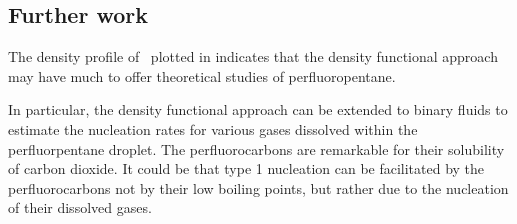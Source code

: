 






\subsection{Further work}
The density profile of \pfp\ plotted in 
indicates that the density functional approach may 
have much to offer theoretical studies of perfluoropentane.

In particular, the density functional approach can be
extended to binary fluids\cite{Talanquer2001} to estimate the nucleation rates for various 
gases dissolved within the perfluorpentane droplet.
The perfluorocarbons are remarkable for their solubility of carbon dioxide.
It could be that type 1  nucleation can be facilitated by the perfluorocarbons  
not by  their low boiling points,
but rather due to the nucleation of their dissolved gases.


